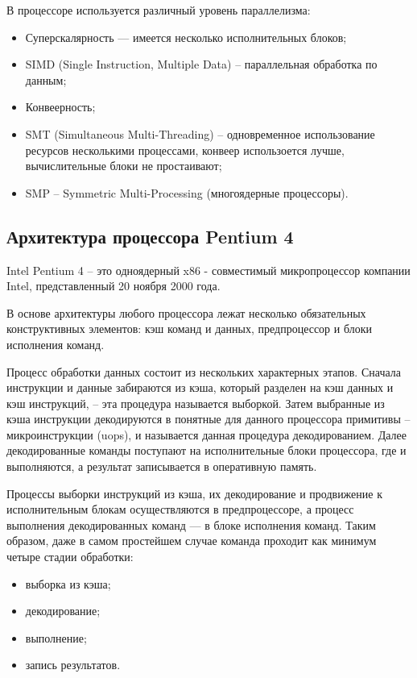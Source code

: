 \documentclass[12pt, a4paper, utf8]{article}
\begin{document}
\noindent
В процессоре используется различный уровень параллелизма:
\begin{itemize}
\item Суперскалярность — имеется несколько исполнительных блоков;
\item SIMD (Single Instruction, Multiple Data) -- параллельная обработка по данным;
\item Конвеерность;
\item SMT (Simultaneous Multi-Threading) -- одновременное использование ресурсов несколькими процессами, конвеер использоется лучше, вычислительные блоки не простаивают;
\item SMP – Symmetric Multi-Processing (многоядерные процессоры).
\end{itemize}

\subsection{Архитектура процессора Pentium 4}
Intel Pentium 4 -- это одноядерный x86 - совместимый микропроцессор компании Intel, представленный 20 ноября 2000 года.

В основе архитектуры любого процессора лежат несколько обязательных конструктивных элементов: кэш команд и данных, предпроцессор и блоки исполнения команд.

Процесс обработки данных состоит из нескольких характерных этапов. Сначала инструкции и данные забираются из кэша, который разделен на кэш данных и кэш инструкций, -- эта процедура называется выборкой. Затем выбранные из кэша инструкции декодируются в понятные для данного процессора примитивы -- микроинструкции (uops), и называется данная процедура декодированием. Далее декодированные команды поступают на исполнительные блоки процессора, где и выполняются, а результат записывается в оперативную память.

Процессы выборки инструкций из кэша, их декодирование и продвижение к исполнительным блокам осуществляются в предпроцессоре, а процесс выполнения декодированных команд — в блоке исполнения команд. Таким образом, даже в самом простейшем случае команда проходит как минимум четыре стадии обработки:
\begin{itemize}
\item выборка из кэша;
\item декодирование;
\item выполнение;
\item запись результатов.
\end{itemize}
\end{document}
